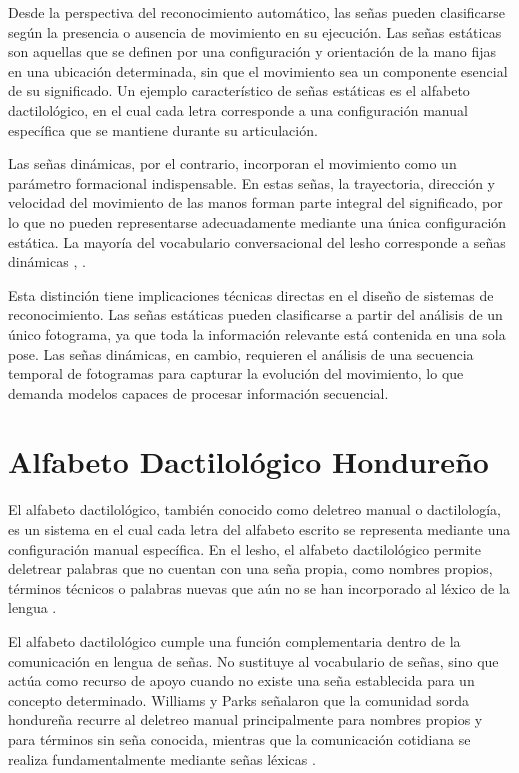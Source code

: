 Desde la perspectiva del reconocimiento automático, las señas pueden clasificarse según la
presencia o ausencia de movimiento en su ejecución. Las señas estáticas son aquellas que
se definen por una configuración y orientación de la mano fijas en una ubicación
determinada, sin que el movimiento sea un componente esencial de su significado. Un
ejemplo característico de señas estáticas es el alfabeto dactilológico, en el cual cada letra
corresponde a una configuración manual específica que se mantiene durante su
articulación.

Las señas dinámicas, por el contrario, incorporan el movimiento como un parámetro
formacional indispensable. En estas señas, la trayectoria, dirección y velocidad del
movimiento de las manos forman parte integral del significado, por lo que no pueden
representarse adecuadamente mediante una única configuración estática. La mayoría del
vocabulario conversacional del \acrshort{lesho} corresponde a señas dinámicas \cite{stokoe_structure_1960}, \cite{sandler_universals_2006}.

Esta distinción tiene implicaciones técnicas directas en el diseño de sistemas de
reconocimiento. Las señas estáticas pueden clasificarse a partir del análisis de un único
fotograma, ya que toda la información relevante está contenida en una sola pose. Las señas
dinámicas, en cambio, requieren el análisis de una secuencia temporal de fotogramas para
capturar la evolución del movimiento, lo que demanda modelos capaces de procesar
información secuencial.

\section{Alfabeto Dactilológico Hondureño}

El alfabeto dactilológico, también conocido como deletreo manual o dactilología, es un
sistema en el cual cada letra del alfabeto escrito se representa mediante una configuración
manual específica. En el \acrshort{lesho}, el alfabeto dactilológico permite deletrear palabras que
no cuentan con una seña propia, como nombres propios, términos técnicos o palabras
nuevas que aún no se han incorporado al léxico de la lengua \cite{ash_diccionario_2019}.

El alfabeto dactilológico cumple una función complementaria dentro de la comunicación en
lengua de señas. No sustituye al vocabulario de señas, sino que actúa como recurso de
apoyo cuando no existe una seña establecida para un concepto determinado. Williams y
Parks señalaron que la comunidad sorda hondureña recurre al deletreo manual
principalmente para nombres propios y para términos sin seña conocida, mientras que la
comunicación cotidiana se realiza fundamentalmente mediante señas léxicas \cite{williams_encuesta_2015}.

